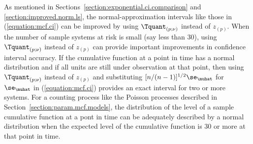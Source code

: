 As mentioned in Sections~\ref{section:exponential.ci.comparison} and
\ref{section:improved.norm.ls}, the normal-approximation intervals
like those in (\ref{equation:mcf.ci}) can be
improved by using $\Tquant_{(p;\nu)}$ instead of $z_{(p)}$. When the
number of sample systems at risk is small (say less than 30), using
$\Tquant_{(p;\nu)}$ instead of $z_{(p)}$ can provide important
improvements in confidence interval accuracy.  If the cumulative
function at a point in time has a normal distribution and if all
units are still under observation at that point, then using
$\Tquant_{(p;\nu)}$ instead of $z_{(p)}$ and substituting
$[n/(n-1)]^{1/2}\se_{\muhat}$ for $\se_{\muhat}$ in
(\ref{equation:mcf.ci}) provides an exact interval for two or more
systems. For a counting process like the Poisson processes described
in Section~\ref{section:param.mcf.models}, the distribution of the
level of a sample cumulative function at a pont in time can be
adequately described by a normal distribution when the expected
level of the cumulative function is 30 or more at that point in
time.


